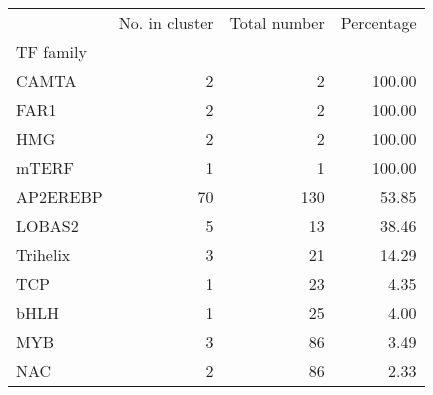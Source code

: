 \begin{tabular}{lrrr}
\toprule
{} &  No. in cluster &  Total number &  Percentage \\
TF family &                 &               &             \\
\midrule
CAMTA     &               2 &             2 &      100.00 \\
FAR1      &               2 &             2 &      100.00 \\
HMG       &               2 &             2 &      100.00 \\
mTERF     &               1 &             1 &      100.00 \\
AP2EREBP  &              70 &           130 &       53.85 \\
LOBAS2    &               5 &            13 &       38.46 \\
Trihelix  &               3 &            21 &       14.29 \\
TCP       &               1 &            23 &        4.35 \\
bHLH      &               1 &            25 &        4.00 \\
MYB       &               3 &            86 &        3.49 \\
NAC       &               2 &            86 &        2.33 \\
\bottomrule
\end{tabular}
